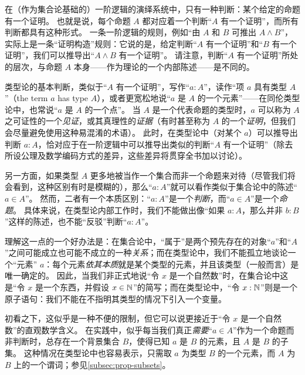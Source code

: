 在（作为集合论基础的）一阶逻辑的演绎系统中，只有一种判断：某个给定的命题有一个证明。
也就是说，每个命题 $A$ 都对应着一个判断“$A$ 有一个证明”，而所有判断都具有这种形式。
一条一阶逻辑的规则，例如“由 $A$ 和 $B$ 可推出 $A\wedge B$”，实际上是一条“证明构造”规则：它说的是，给定判断“$A$ 有一个证明”和“$B$ 有一个证明”，我们可以推导出“$A\wedge B$ 有一个证明”。
请注意，判断“$A$ 有一个证明”所处的层次，与命题 $A$ 本身——作为理论的一个内部陈述——是不同的。

类型论的基本判断，类似于“$A$ 有一个证明”，写作“$a:A$”，读作“项 $a$ 具有类型 $A$”（the term $a$ has type $A$），或者更宽松地说“$a$ 是 $A$ 的一个元素”——在同伦类型论中，也常说“$a$ 是 $A$ 的一个点”。
%
%
%
当 $A$ 是一个代表命题的类型时，$a$ 可以称为 $A$ 之可证性的一个\emph{见证}，或其真理性的\emph{证据}（有时甚至称为 $A$ 的一个\emph{证明}，但我们会尽量避免使用这种易混淆的术语）。
此时，在类型论中（对某个 $a$）可以推导出判断 $a:A$，恰对应于在一阶逻辑中可以推导出类似的判断“$A$ 有一个证明”（除去所设公理及数学编码方式的差异，这些差异将贯穿全书加以讨论）。

另一方面，如果类型 $A$ 更多地被当作一个集合而非一个命题来对待（尽管我们将会看到，这种区别有时是模糊的），那么“$a:A$”就可以看作类似于集合论中的陈述“$a\in A$”。
然而，二者有一个本质区别：“$a:A$”是一个\emph{判断}，而“$a\in A$”是一个\emph{命题}。
具体来说，在类型论内部工作时，我们不能做出像“如果 $a:A$，那么并非 $b:B$”这样的陈述，也不能“反驳”判断“$a:A$”。

理解这一点的一个好办法是：在集合论中，“属于”是两个预先存在的对象“$a$”和“$A$”之间可能成立也可能不成立的一种\emph{关系}；而在类型论中，我们不能孤立地谈论一个“元素” $a$：每个元素\emph{依其本质}就是某个类型的元素，并且该类型（一般而言）是唯一确定的。
因此，当我们非正式地说“令 $x$ 是一个自然数”时，在集合论中这是“令 $x$ 是一个东西，并假设 $x\in\mathbb{N}$”的简写；而在类型论中，“令 $x:\mathbb{N}$”则是一个原子语句：我们不能在不指明其类型的情况下引入一个变量。

初看之下，这似乎是一种不便的限制，但它可以说更接近于“令 $x$ 是一个自然数”的直观数学含义。
在实践中，似乎每当我们真正\emph{需要}“$a\in A$”作为一个命题而非判断时，总存在一个背景集合 $B$，使得已知 $a$ 是 $B$ 的元素，且 $A$ 是 $B$ 的子集。
这种情况在类型论中也容易表示，只需取 $a$ 为类型 $B$ 的一个元素，而 $A$ 为 $B$ 上的一个谓词；参见\cref{subsec:prop-subsets}。


